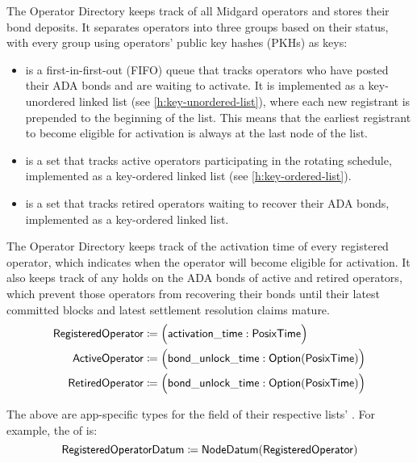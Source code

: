 \documentclass[../midgard.tex]{subfiles}
\begin{document}
The Operator Directory keeps track of all Midgard operators and stores their bond deposits.
It separates operators into three groups based on their status, with every group using operators' public key hashes (PKHs) as keys:
\begin{itemize}
    \item {} is a first-in-first-out (FIFO) queue that tracks operators who have posted their ADA bonds and are waiting to activate.
      It is implemented as a key-unordered linked list (see \cref{h:key-unordered-list}), where each new registrant is prepended to the beginning of the list.
      This means that the earliest registrant to become eligible for activation is always at the last node of the list.
    \item {} is a set that tracks active operators participating in the rotating schedule, implemented as a key-ordered linked list (see \cref{h:key-ordered-list}).
    \item {} is a set that tracks retired operators waiting to recover their ADA bonds, implemented as a key-ordered linked list.
\end{itemize}

The Operator Directory keeps track of the activation time of every registered operator, which indicates when the operator will become eligible for activation.
It also keeps track of any holds on the ADA bonds of active and retired operators, which prevent those operators from recovering their bonds until their latest committed blocks and latest settlement resolution claims mature.
\begin{align*}
    \mathsf{RegisteredOperator} &\coloneq \Bigl( \mathsf{activation\_time}: \mathsf{PosixTime} \Bigr) \\
    \mathsf{ActiveOperator}     &\coloneq \Bigl( \mathsf{bond\_unlock\_time}:
        \mathsf{Option}(\mathsf{PosixTime}) \Bigr) \\
    \mathsf{RetiredOperator}    &\coloneq \Bigl( \mathsf{bond\_unlock\_time}:
        \mathsf{Option}(\mathsf{PosixTime}) \Bigr)
\end{align*}

The above are app-specific types for the  field of their respective lists' .
For example, the  of  is:
\begin{equation*}
    \mathsf{RegisteredOperatorDatum} \coloneq \mathsf{NodeDatum} (\mathsf{RegisteredOperator})
\end{equation*}
\end{document}
